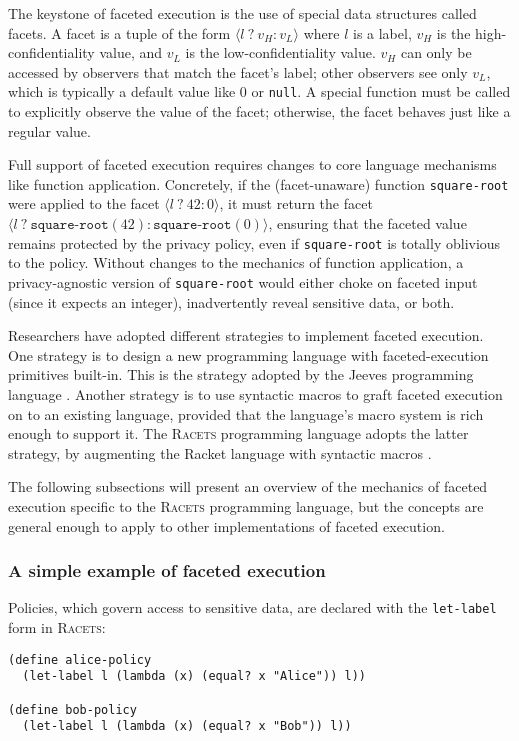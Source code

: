 \documentclass{article}
\begin{document}
The keystone of faceted execution is the use of special data structures called facets. A facet is a tuple of the form $\langle l\ ?\ v_H : v_L \rangle$ where $l$ is a label, $v_H$ is the high-confidentiality value, and $v_L$ is the low-confidentiality value. $v_H$ can only be accessed by observers that match the facet's label; other observers see only $v_L$, which is typically a default value like $0$ or \texttt{null}. A special function must be called to explicitly observe the value of the facet; otherwise, the facet behaves just like a regular value.

Full support of faceted execution requires changes to core language mechanisms like function application. Concretely, if the (facet-unaware) function \texttt{square-root} were applied to the facet $\langle l \ ?\ 42 : 0 \rangle$, it must return the facet $\langle l \ ?\ \texttt{square-root}(42) : \texttt{square-root}(0) \rangle$, ensuring that the faceted value remains protected by the privacy policy, even if \texttt{square-root} is totally oblivious to the policy. Without changes to the mechanics of function application, a privacy-agnostic version of \texttt{square-root} would either choke on faceted input (since it expects an integer), inadvertently reveal sensitive data, or both.

Researchers have adopted different strategies to implement faceted execution. One strategy is to design a new programming language with faceted-execution primitives built-in. This is the strategy adopted by the Jeeves programming language \cite{jeeves}. Another strategy is to use syntactic macros to graft faceted execution on to an existing language, provided that the language's macro system is rich enough to support it. The \textsc{Racets} programming language adopts the latter strategy, by augmenting the Racket language with syntactic macros \cite{racets}.

The following subsections will present an overview of the mechanics of faceted execution specific to the \textsc{Racets} programming language, but the concepts are general enough to apply to other implementations of faceted execution.


\subsubsection{A simple example of faceted execution}
Policies, which govern access to sensitive data, are declared with the \texttt{let-label} form in \textsc{Racets}:

\begin{lstlisting}
(define alice-policy
  (let-label l (lambda (x) (equal? x "Alice")) l))

(define bob-policy
  (let-label l (lambda (x) (equal? x "Bob")) l))
\end{lstlisting}
\end{document}
